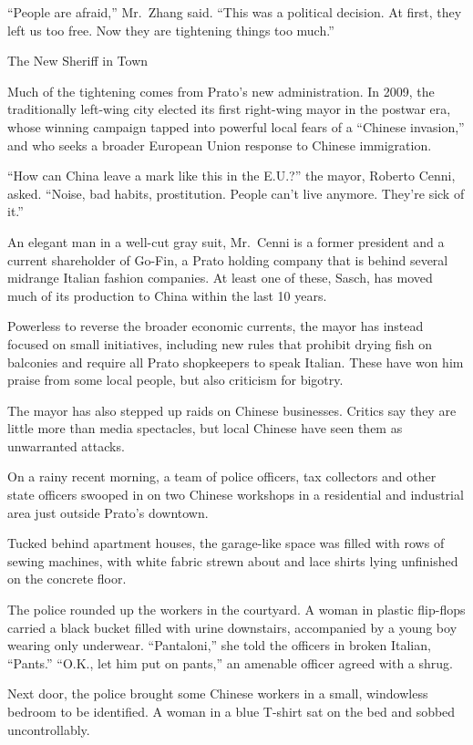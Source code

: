 ﻿\documentclass[12pt]{article}
\begin{document}
``People are afraid,'' Mr.~Zhang said. ``This was a political decision. At first, they left us too
free. Now they are tightening things too much.''

\textsf{The New Sheriff in Town}

Much of the tightening comes from Prato's new administration. In 2009, the traditionally left-wing
city elected its first right-wing mayor in the postwar era, whose winning campaign tapped into
powerful local fears of a ``Chinese invasion,'' and who seeks a broader European Union response to
Chinese immigration.

``How can China leave a mark like this in the E.U.?'' the mayor, Roberto Cenni, asked. ``Noise, bad
habits, prostitution. People can't live anymore. They're sick of it.''

An elegant man in a well-cut gray suit, Mr.~Cenni is a former president and a current shareholder of
Go-Fin, a Prato holding company that is behind several midrange Italian fashion companies. At least
one of these, Sasch, has moved much of its production to China within the last 10 years.

Powerless to reverse the broader economic currents, the mayor has instead focused on small
initiatives, including new rules that prohibit drying fish on balconies and require all Prato
shopkeepers to speak Italian. These have won him praise from some local people, but also criticism
for bigotry.

The mayor has also stepped up raids on Chinese businesses. Critics say they are little more than
media spectacles, but local Chinese have seen them as unwarranted attacks.

On a rainy recent morning, a team of police officers, tax collectors and other state officers
swooped in on two Chinese workshops in a residential and industrial area just outside Prato's
downtown.

Tucked behind apartment houses, the garage-like space was filled with rows of sewing machines, with
white fabric strewn about and lace shirts lying unfinished on the concrete floor.

The police rounded up the workers in the courtyard. A woman in plastic flip-flops carried a black
bucket filled with urine downstairs, accompanied by a young boy wearing only underwear.
``Pantaloni,'' she told the officers in broken Italian, ``Pants.'' ``O.K., let him put on pants,''
an amenable officer agreed with a shrug.

Next door, the police brought some Chinese workers in a small, windowless bedroom to be identified.
A woman in a blue T-shirt sat on the bed and sobbed uncontrollably.
\end{document}
